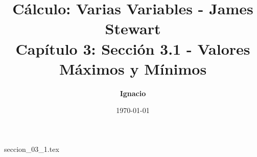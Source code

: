 \documentclass[11pt,spanish,oneside]{report}
\title{\textbf{Cálculo: Varias Variables - James Stewart} \\ \Large Capítulo 3: Sección 3.1 - Valores Máximos y Mínimos}
\author{\textbf{Ignacio}}
\date{\today}
\begin{document}
\maketitle

{seccion_03_1.tex}
\end{document}
